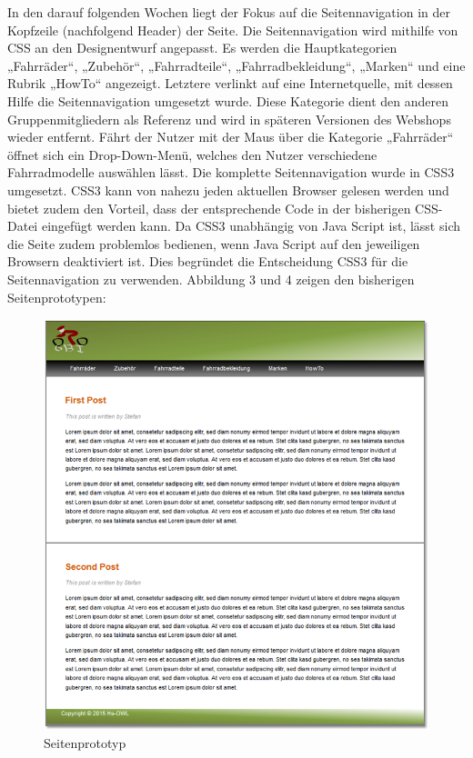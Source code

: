 In den darauf folgenden Wochen liegt der Fokus auf die Seitennavigation in der Kopfzeile (nachfolgend Header) der Seite. Die Seitennavigation wird mithilfe von CSS an den Designentwurf angepasst. Es werden die Hauptkategorien „Fahrräder“, „Zubehör“, „Fahrradteile“, „Fahrradbekleidung“, „Marken“ und eine Rubrik „HowTo“ angezeigt. Letztere verlinkt auf eine Internetquelle, mit dessen Hilfe die Seitennavigation umgesetzt wurde. Diese Kategorie dient den anderen Gruppenmitgliedern als Referenz und wird in späteren Versionen des Webshops wieder entfernt. Fährt der Nutzer mit der Maus über die Kategorie „Fahrräder“ öffnet sich ein Drop-Down-Menü, welches den Nutzer verschiedene Fahrradmodelle auswählen lässt. Die komplette Seitennavigation wurde in CSS3 umgesetzt. CSS3 kann von nahezu jeden aktuellen Browser gelesen werden und bietet zudem den Vorteil, dass der entsprechende Code in der bisherigen CSS-Datei eingefügt werden kann. Da CSS3 unabhängig von Java Script ist, lässt sich die Seite zudem problemlos bedienen, wenn Java Script auf den jeweiligen Browsern deaktiviert ist. Dies begründet die Entscheidung CSS3 für die Seitennavigation zu verwenden.
Abbildung 3 und 4 zeigen den bisherigen Seitenprototypen:



\begin{figure}[H]
\begin{center}
\includegraphics[width=150mm]{Bilder/Abbildung3-Seitenprototyp.png}
\end{center}
\caption{Seitenprototyp}
\label{Abbildung3-Seitenprototyp}
\end{figure}



